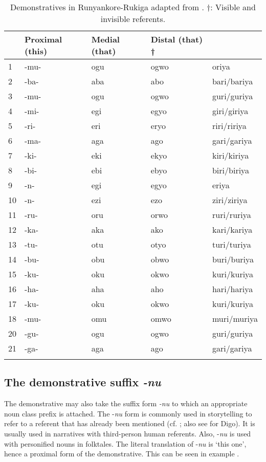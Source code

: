 \documentclass[output=paper 		  ]{langscibook}
\begin{document}
\begin{table}
\begin{tabular}{lllll}
\lsptoprule
\multicolumn{2}{c}{Noun class} & Proximal (this) & Medial (that) & Distal (that) †\\
\midrule
1 & -mu- & ogu & ogwo & oriya\\
2 & -ba- & aba & abo & bari/bariya\\
3 & -mu- & ogu & ogwo & guri/guriya\\
4 & -mi- & egi & egyo & giri/giriya\\
5 & -ri- & eri & eryo & riri/ririya\\
6 & -ma- & aga & ago & gari/gariya\\
7 & -ki- & eki & ekyo & kiri/kiriya\\
8 & -bi- & ebi & ebyo & biri/biriya\\
9 & -n- & egi & egyo & eriya\\
10 & -n- & ezi & ezo & ziri/ziriya\\
11 & -ru- & oru & orwo & ruri/ruriya\\
12 & -ka- & aka & ako & kari/kariya\\
13 & -tu- & otu & otyo & turi/turiya\\
14 & -bu- & obu & obwo & buri/buriya\\
15 & -ku- & oku & okwo & kuri/kuriya\\
16 & -ha- & aha & aho & hari/hariya\\
17 & -ku- & oku & okwo & kuri/kuriya\\
18 & -mu- & omu & omwo & muri/muriya\\
20 & -gu- & ogu & ogwo & guri/guriya\\
21 & -ga- & aga & ago & gari/gariya\\
\lspbottomrule
\end{tabular}
\caption{Demonstratives in Run\-yan\-ko\-re-Ru\-ki\-ga adapted from \citet[136]{Taylor1985}. †: Visible and invisible referents.}
\label{tab:asiimwe:1}
\end{table}

\subsection{The demonstrative suffix \textit{{}-nu}}\label{sec:asiimwe:2.3}

The demonstrative may also take the suffix form \textit{{}-nu} to which an appropriate noun class prefix is attached. The -\textit{nu} form is commonly used in storytelling to refer to a referent that has already been mentioned (cf. \citealt[59]{MorrisKirwan1972}; also see \citealt{Nicolle2012, Nicolle2014} for Digo). It is usually used in narratives with third-person human referents. Also, -\textit{nu} is used with personified nouns in folktales. The literal translation of -\textit{nu} is ‘this one’, hence a proximal form of the demonstrative. This can be seen in example .
\end{document}
